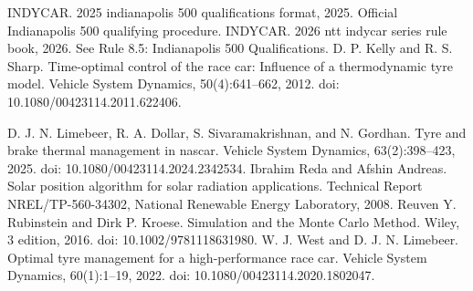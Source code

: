 INDYCAR. 2025 indianapolis 500 qualifications format, 2025. Official Indianapolis 500 qualifying procedure. INDYCAR. 2026 ntt indycar series rule book, 2026. See Rule 8.5: Indianapolis 500 Qualifications. D. P. Kelly and R. S. Sharp. Time-optimal control of the race car: Influence of a thermodynamic tyre model. Vehicle System Dynamics, 50(4):641--662, 2012. doi: 10.1080/00423114.2011.622406.

D. J. N. Limebeer, R. A. Dollar, S. Sivaramakrishnan, and N. Gordhan. Tyre and brake thermal management in nascar. Vehicle System Dynamics, 63(2):398--423, 2025. doi: 10.1080/00423114.2024.2342534. Ibrahim Reda and Afshin Andreas. Solar position algorithm for solar radiation applications. Technical Report NREL/TP-560-34302, National Renewable Energy Laboratory, 2008. Reuven Y. Rubinstein and Dirk P. Kroese. Simulation and the Monte Carlo Method. Wiley, 3 edition, 2016. doi: 10.1002/9781118631980. W. J. West and D. J. N. Limebeer. Optimal tyre management for a high-performance race car. Vehicle System Dynamics, 60(1):1--19, 2022. doi: 10.1080/00423114.2020.1802047.
